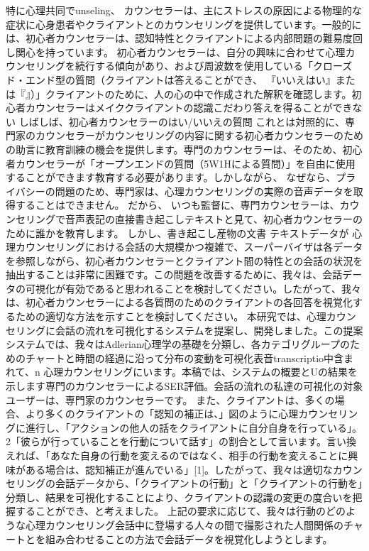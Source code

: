 \documentclass[shuuron]{kuee}
\begin{document}
  特に心理共同でunseling、 カウンセラーは、主にストレスの原因による物理的な症状に心身患者やクライアントとのカウンセリングを提供しています。一般的には、初心者カウンセラーは、認知特性とクライアントによる内部問題の難易度回し関心を持っています。
  初心者カウンセラーは、自分の興味に合わせて心理カウンセリングを続行する傾向があり、および周波数を使用している「クローズド・エンド型の質問（クライアントは答えることができ、 『いいえはい』または『』）」クライアントのために、人の心の中で作成された解釈を確認します。初心者カウンセラーはメイククライアントの認識こだわり答えを得ることができない
しばしば、初心者カウンセラーのはい/いいえの質問
  これとは対照的に、専門家のカウンセラーがカウンセリングの内容に関する初心者カウンセラーのための助言に教育訓練の機会を提供します。専門のカウンセラーは、そのため、初心者カウンセラーが「オープンエンドの質問（5W1Hによる質問）」を自由に使用することができます教育する必要があります。しかしながら、 なぜなら、プライバシーの問題のため、専門家は、心理カウンセリングの実際の音声データを取得することはできません。 だから、 いつも監督に、専門カウンセラーは、カウンセリングで音声表記の直接書き起こしテキストと見て、初心者カウンセラーのために誰かを教育します。
  しかし、書き起こし産物の文書 テキストデータが 心理カウンセリングにおける会話の大規模かつ複雑で、スーパーバイザは各データを参照しながら、初心者カウンセラーとクライアント間の特性との会話の状況を抽出することは非常に困難です。この問題を改善するために、我々は、会話データの可視化が有効であると思われることを検討してください。したがって、我々は、初心者カウンセラーによる各質問のためのクライアントの各回答を視覚化するための適切な方法を示すことを検討してください。
  本研究では、心理カウンセリングに会話の流れを可視化するシステムを提案し、開発しました。この提案システムでは、我々はAdlerian心理学の基礎を分類し、各カテゴリグループのためのチャートと時間の経過に沿って分布の変動を可視化表音transcriptio中含まれて、n 心理カウンセリングにいます。本稿では、システムの概要とUの結果を示します専門のカウンセラーによるSER評価。会話の流れの私達の可視化の対象ユーザーは、専門家のカウンセラーです。
   また、クライアントは、多くの場合、より多くのクライアントの「認知の補正は、」図のように心理カウンセリングに進行し、「アクションの他人の話をクライアントに自分自身を行っている」。2「彼らが行っていることを行動について話す」の割合として言います。言い換えれば、「あなた自身の行動を変えるのではなく、相手の行動を変えることに興味がある場合は、認知補正が進んでいる」[1]。したがって、我々は適切なカウンセリングの会話データから、「クライアントの行動」と「クライアントの行動を」分類し、結果を可視化することにより、クライアントの認識の変更の度合いを把握することができ、と考えました。
  上記の要求に応じて、我々は行動のどのような心理カウンセリング会話中に登場する人々の間で撮影された人間関係のチャートとを組み合わせることの方法で会話データを視覚化しようとします。
\end{document}
